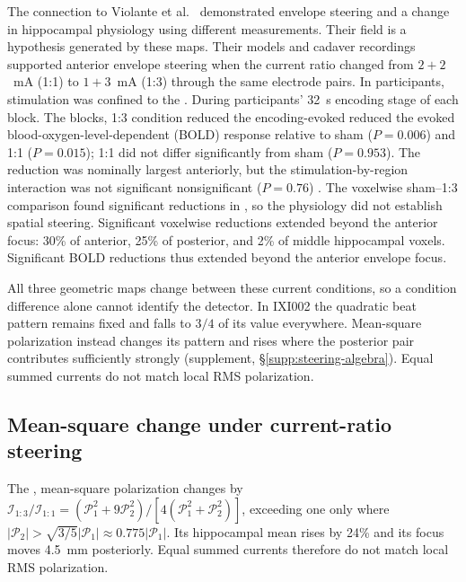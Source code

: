 \documentclass[11pt,a4paper]{article}
\newif\ifjne
\providecommand{\DIFaddtex}[1]{{\protect\color{blue} \sf #1}} %
\providecommand{\DIFdeltex}[1]{{\protect\color{red} \scriptsize #1}} %
\providecommand{\DIFaddbegin}{} %
\providecommand{\DIFaddend}{} %
\providecommand{\DIFdelbegin}{} %
\providecommand{\DIFdelend}{} %
\providecommand{\DIFadd}[1]{\texorpdfstring{\DIFaddtex{#1}}{#1}} %
\providecommand{\DIFdel}[1]{\texorpdfstring{\DIFdeltex{#1}}{}} %
\begin{document}
\DIFaddbegin \DIFadd{The connection to }\DIFaddend Violante et al.\ \cite{violante2023} \DIFdelbegin \DIFdel{demonstrated envelope steering and a change in hippocampal physiology using different measurements. Their field
}\DIFdelend \DIFaddbegin \DIFadd{is a hypothesis generated
by these maps. Their }\DIFaddend models and cadaver recordings supported anterior envelope
steering \DIFdelbegin \DIFdel{when the
current ratio changed }\DIFdelend from $2+2$~mA \DIFdelbegin \DIFdel{(1:1) }\DIFdelend to $1+3$~mA\DIFdelbegin \DIFdel{(1:3) through the same
electrode pairs. In participants, stimulation was confined to the }\DIFdelend \DIFaddbegin \DIFadd{. During participants' }\DIFaddend 32~s encoding \DIFdelbegin \DIFdel{stage of each block. The }\DIFdelend \DIFaddbegin \DIFadd{blocks,
}\DIFaddend 1:3 \DIFdelbegin \DIFdel{condition reduced the encoding-evoked
}\DIFdelend \DIFaddbegin \DIFadd{reduced the evoked }\DIFaddend blood-oxygen-level-dependent (BOLD) response relative
to sham ($P=0.006$) and 1:1 ($P=0.015$); 1:1 did not differ \DIFdelbegin \DIFdel{significantly }\DIFdelend from sham
($P=0.953$). The \DIFdelbegin \DIFdel{reduction was nominally largest anteriorly, but the }\DIFdelend stimulation-by-region interaction was \DIFdelbegin \DIFdel{not significant }\DIFdelend \DIFaddbegin \DIFadd{nonsignificant
}\DIFaddend ($P=0.76$)\DIFdelbegin \DIFdel{. The voxelwise sham--1:3 comparison
found significant reductions in }\DIFdelend \DIFaddbegin \DIFadd{, so the physiology did not establish spatial steering. Significant
voxelwise reductions extended beyond the anterior focus: }\DIFaddend 30\% of anterior,
25\% of posterior, and 2\% of middle hippocampal voxels.
\DIFdelbegin \DIFdel{Significant BOLD reductions thus extended beyond
the anterior envelope focus.
}\DIFdelend

\DIFdelbegin \DIFdel{All three geometric maps change between these current conditions, so a condition
difference alone cannot identify the detector. }\DIFdelend In IXI002\DIFdelbegin \DIFdel{the quadratic beat pattern remains fixed and falls to $3/4$ of
its value everywhere. Mean-square polarization instead changes its pattern and
rises where the posterior pair contributes sufficiently strongly (supplement, \S\ref{supp:steering-algebra}). Equal summed currents do not match local RMS
polarization.
}%
\subsection{\DIFdel{Mean-square change under current-ratio steering}}%
\addtocounter{subsection}{-1}%
\DIFdel{The }\DIFdelend \DIFaddbegin \DIFadd{, }\DIFaddend mean-square polarization \DIFdelbegin \DIFdel{changes by $\mathcal I_{1:3}/\mathcal I_{1:1}
=(\mathcal P_1^2+9\mathcal P_2^2)/[4(\mathcal P_1^2+\mathcal P_2^2)]$,
exceeding one only where $|\mathcal P_2|>\sqrt{3/5}|\mathcal P_1|
\approx0.775|\mathcal P_1|$. Its hippocampal mean }\DIFdelend rises by 24\% \DIFdelbegin \DIFdel{and its focus
moves 4.5~mm posteriorly. Equal summed currents therefore do not match local
RMS polarization.
}%
\end{document}
